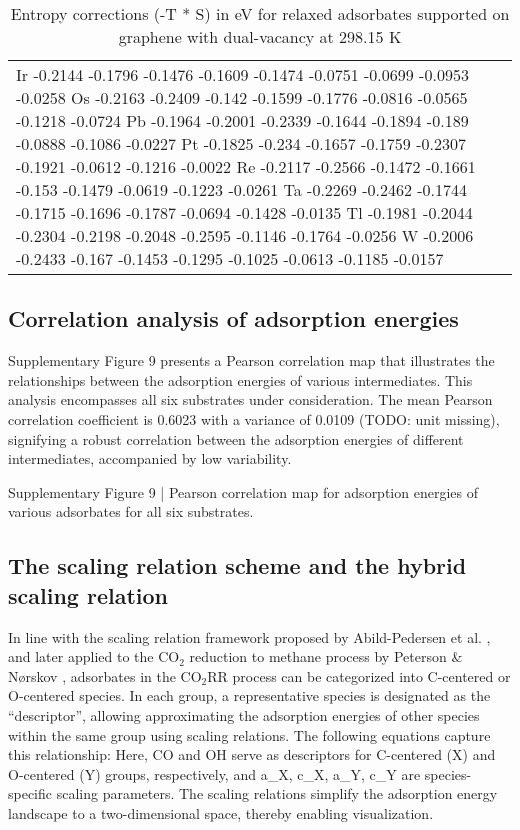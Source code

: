 \begin{table}[h]
\begin{tabular}{lr}
      Ir	-0.2144	-0.1796	-0.1476	-0.1609	-0.1474	-0.0751	-0.0699	-0.0953	-0.0258
      Os	-0.2163	-0.2409	-0.142	-0.1599	-0.1776	-0.0816	-0.0565	-0.1218	-0.0724
      Pb	-0.1964	-0.2001	-0.2339	-0.1644	-0.1894	-0.189	-0.0888	-0.1086	-0.0227
      Pt	-0.1825	-0.234	-0.1657	-0.1759	-0.2307	-0.1921	-0.0612	-0.1216	-0.0022
      Re	-0.2117	-0.2566	-0.1472	-0.1661	-0.153	-0.1479	-0.0619	-0.1223	-0.0261
      Ta	-0.2269	-0.2462	-0.1744	-0.1715	-0.1696	-0.1787	-0.0694	-0.1428	-0.0135
      Tl	-0.1981	-0.2044	-0.2304	-0.2198	-0.2048	-0.2595	-0.1146	-0.1764	-0.0256
      W	  -0.2006	-0.2433	-0.167	-0.1453	-0.1295	-0.1025	-0.0613	-0.1185	-0.0157
      \hline
    \end{tabular}
    \caption{Entropy corrections (-T * S) in eV for relaxed adsorbates supported on graphene with dual-vacancy at 298.15 K}
    \label{si_table12}
\end{table}


\subsection{Correlation analysis of adsorption energies}
Supplementary Figure 9 presents a Pearson correlation map that illustrates the relationships between the adsorption energies of various intermediates. This analysis encompasses all six substrates under consideration. The mean Pearson correlation coefficient is 0.6023 with a variance of 0.0109 (TODO: unit missing), signifying a robust correlation between the adsorption energies of different intermediates, accompanied by low variability.


Supplementary Figure 9 | Pearson correlation map for adsorption energies of various adsorbates for all six substrates.


\subsection{The scaling relation scheme and the hybrid scaling relation}
In line with the scaling relation framework proposed by Abild-Pedersen et al. \cite{abild2007scaling}, and later applied to the CO$_2$ reduction to methane process by Peterson & Nørskov \cite{peterson2012activity}, adsorbates in the CO$_2$RR process can be categorized into C-centered or O-centered species. In each group, a representative species is designated as the “descriptor”, allowing approximating the adsorption energies of other species within the same group using scaling relations. The following equations capture this relationship:
Here, CO and OH serve as descriptors for C-centered (X) and O-centered (Y) groups, respectively, and a_X, c_X, a_Y, c_Y are species-specific scaling parameters. The scaling relations simplify the adsorption energy landscape to a two-dimensional space, thereby enabling visualization.

